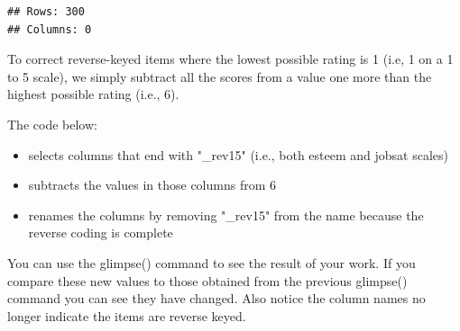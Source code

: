 \documentclass[
]{krantz}
\makeatletter
\newenvironment{Shaded}{\begin{snugshade}}{\end{snugshade}}
\newcommand{\DataTypeTok}[1]{\textcolor[rgb]{0.27,0.27,0.27}{#1}}
\newcommand{\DecValTok}[1]{\textcolor[rgb]{0.06,0.06,0.06}{#1}}
\newcommand{\KeywordTok}[1]{\textcolor[rgb]{0.27,0.27,0.27}{\textbf{#1}}}
\newcommand{\NormalTok}[1]{#1}
\newcommand{\OperatorTok}[1]{\textcolor[rgb]{0.43,0.43,0.43}{\textbf{#1}}}
\newcommand{\StringTok}[1]{\textcolor[rgb]{0.5,0.5,0.5}{#1}}
\providecommand{\tightlist}{%
  \setlength{\itemsep}{0pt}\setlength{\parskip}{0pt}}
\newenvironment{kframe}{%
\medskip{}
\setlength{\fboxsep}{.8em}
 \def\at@end@of@kframe{}%
 \ifinner\ifhmode%
  \def\at@end@of@kframe{\end{minipage}}%
  \begin{minipage}{\columnwidth}%
 \fi\fi%
 \def\FrameCommand##1{\hskip\@totalleftmargin \hskip-\fboxsep
 \colorbox{shadecolor}{##1}\hskip-\fboxsep
     \hskip-\linewidth \hskip-\@totalleftmargin \hskip\columnwidth}%
 \MakeFramed {\advance\hsize-\width
   \@totalleftmargin\z@ \linewidth\hsize
   \@setminipage}}%
 {\par\unskip\endMakeFramed%
 \at@end@of@kframe}
\renewenvironment{Shaded}{\begin{kframe}}{\end{kframe}}
\makeatother
\begin{document}
\begin{Shaded}
\end{Shaded}

\begin{verbatim}
## Rows: 300
## Columns: 0
\end{verbatim}

To correct reverse-keyed items where the lowest possible rating is 1 (i.e, 1 on a 1 to 5 scale), we simply subtract all the scores from a value one more than the highest possible rating (i.e., 6).

The code below:

\begin{itemize}
\tightlist
\item
  selects columns that end with "\_rev15" (i.e., both esteem and jobsat scales)
\item
  subtracts the values in those columns from 6
\item
  renames the columns by removing "\_rev15" from the name because the reverse coding is complete
\end{itemize}

\begin{Shaded}
\end{Shaded}

You can use the glimpse() command to see the result of your work. If you compare these new values to those obtained from the previous glimpse() command you can see they have changed. Also notice the column names no longer indicate the items are reverse keyed.
\end{document}
